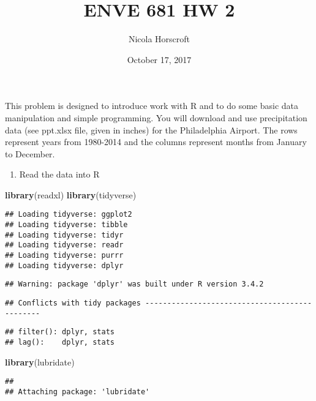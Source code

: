 \documentclass[]{article}
\title{ENVE 681 HW 2}
\author{Nicola Horscroft}
\date{October 17, 2017}
\newenvironment{Shaded}{\begin{snugshade}}{\end{snugshade}}
\newcommand{\KeywordTok}[1]{\textcolor[rgb]{0.13,0.29,0.53}{\textbf{#1}}}
\newcommand{\NormalTok}[1]{#1}
\providecommand{\tightlist}{%
  \setlength{\itemsep}{0pt}\setlength{\parskip}{0pt}}
\begin{document}
\maketitle

This problem is designed to introduce work with R and to do some basic
data manipulation and simple programming. You will download and use
precipitation data (see ppt.xlsx file, given in inches) for the
Philadelphia Airport. The rows represent years from 1980-2014 and the
columns represent months from January to December.

\begin{enumerate}
\def\labelenumi{\arabic{enumi}.}
\tightlist
\item
  Read the data into R
\end{enumerate}

\begin{Shaded}
\begin{Highlighting}[]
\KeywordTok{library}\NormalTok{(readxl)}
\KeywordTok{library}\NormalTok{(tidyverse)}
\end{Highlighting}
\end{Shaded}

\begin{verbatim}
## Loading tidyverse: ggplot2
## Loading tidyverse: tibble
## Loading tidyverse: tidyr
## Loading tidyverse: readr
## Loading tidyverse: purrr
## Loading tidyverse: dplyr
\end{verbatim}

\begin{verbatim}
## Warning: package 'dplyr' was built under R version 3.4.2
\end{verbatim}

\begin{verbatim}
## Conflicts with tidy packages ----------------------------------------------
\end{verbatim}

\begin{verbatim}
## filter(): dplyr, stats
## lag():    dplyr, stats
\end{verbatim}

\begin{Shaded}
\begin{Highlighting}[]
\KeywordTok{library}\NormalTok{(lubridate)}
\end{Highlighting}
\end{Shaded}

\begin{verbatim}
## 
## Attaching package: 'lubridate'
\end{verbatim}
\end{document}
